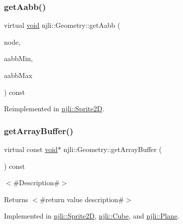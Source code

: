 \mbox{\label{classnjli_1_1_geometry_a79efc86c5c96b88d33adfdc3debcddd4}} 
\subsubsection{\texorpdfstring{get\+Aabb()}{getAabb()}}
{\footnotesize\ttfamily virtual \mbox{\hyperlink{_thread_8h_af1e856da2e658414cb2456cb6f7ebc66}{void}} njli\+::\+Geometry\+::get\+Aabb (\begin{DoxyParamCaption}\item[{\mbox{\hyperlink{classnjli_1_1_node}{Node}} $\ast$}]{node,  }\item[{bt\+Vector3 \&}]{aabb\+Min,  }\item[{bt\+Vector3 \&}]{aabb\+Max }\end{DoxyParamCaption}) const\hspace{0.3cm}{\ttfamily [virtual]}}



Reimplemented in \mbox{\hyperlink{classnjli_1_1_sprite2_d_add0a0f16202c5e62dfff65e08570316d}{njli\+::\+Sprite2D}}.

\mbox{\label{classnjli_1_1_geometry_adbf0ae6c38f23779df2b37708e80c24c}} 
\subsubsection{\texorpdfstring{get\+Array\+Buffer()}{getArrayBuffer()}}
{\footnotesize\ttfamily virtual const \mbox{\hyperlink{_thread_8h_af1e856da2e658414cb2456cb6f7ebc66}{void}}$\ast$ njli\+::\+Geometry\+::get\+Array\+Buffer (\begin{DoxyParamCaption}{ }\end{DoxyParamCaption}) const\hspace{0.3cm}{\ttfamily [pure virtual]}}

$<$\#\+Description\#$>$

\begin{DoxyReturn}{Returns}
$<$\#return value description\#$>$ 
\end{DoxyReturn}


Implemented in \mbox{\hyperlink{classnjli_1_1_sprite2_d_a7cac9e09519030700347f1b803a3084e}{njli\+::\+Sprite2D}}, \mbox{\hyperlink{classnjli_1_1_cube_a33f8ca33a86505fa1bbee02e7ae9ac77}{njli\+::\+Cube}}, and \mbox{\hyperlink{classnjli_1_1_plane_a134447dc787dab9269e68f8011e2973f}{njli\+::\+Plane}}.

